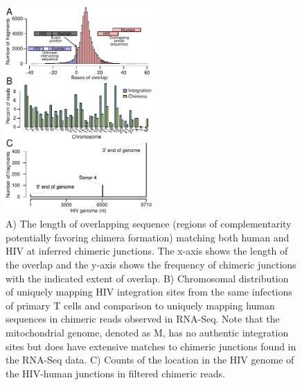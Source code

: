 \documentclass[../sherrill-Mix_thesis.tex]{subfiles}
\begin{document}
		\begin{figure}
				\centering
				\includegraphics[width=0.5\textwidth]{chimeraCombo.pdf}
			\caption[Analysis of chimeric RNA sequences containing both human and HIV sequences.]{ A) The length of overlapping sequence (regions of complementarity potentially favoring chimera formation) matching both human and HIV at inferred chimeric junctions. The x-axis shows the length of the overlap and the y-axis shows the frequency of chimeric junctions with the indicated extent of overlap.  B) Chromosomal distribution of uniquely mapping HIV integration sites from the same infections of primary T cells and comparison to uniquely mapping human sequences in chimeric reads observed in RNA-Seq. Note that the mitochondrial genome, denoted as M, has no authentic integration sites but does have extensive matches to chimeric junctions found in the RNA-Seq data. C) Counts of the location in the HIV genome of the HIV-human junctions in filtered chimeric reads.} %
			\label{figChimera}
		\end{figure}
\end{document}
